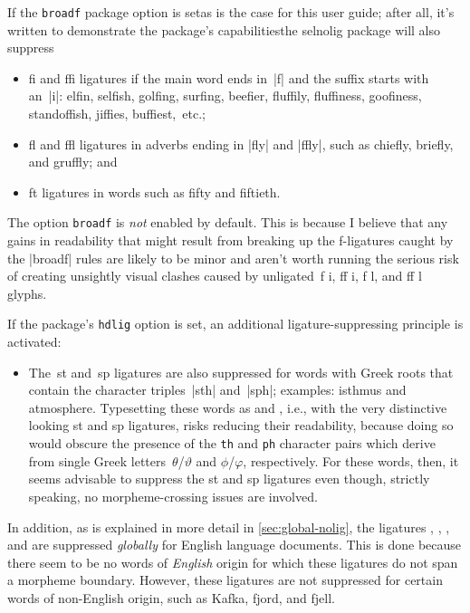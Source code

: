 \documentclass[11pt]{article}
\newcommand{\pkg}[1]{\textsf{#1}}
\newcommand{\opt}[1]{\texttt{#1}}
\begin{document}
If the \opt{broadf} package option is set\textemdash as is the case for this user guide; after all, it's written to demonstrate the package's capabilities\textemdash the \pkg{selnolig} package will also suppress
\begin{itemize}
\item fi and ffi ligatures if the main word ends in~|f| and the suffix starts with an~|i|: elfin, selfish, golfing, surfing, beefier, fluffily, fluffiness, goofiness, standoffish, jiffies, buffiest,~etc.;
\item fl and ffl ligatures in adverbs ending in |fly| and |ffly|, such as chiefly, briefly, and gruffly; and
\item ft ligatures in words such as fifty and fiftieth.
\end{itemize}

The option \opt{broadf} is \emph{not} enabled by default. This is because I believe that any gains in readability that might result from breaking up the f-ligatures caught by the |broadf| rules are likely to be minor and aren't worth running the serious risk of creating unsightly visual clashes caused by unligated~f\kern0pt i, ff\kern0pt i, f\kern0pt l, and ff\kern0pt l glyphs.

If the package's \opt{hdlig} option is set, an additional ligature-suppressing principle is activated:
\begin{itemize}
\item The~st and~sp ligatures are also suppressed for words with Greek roots that contain the character triples~|sth| and~|sph|; examples: isthmus and atmosphere. Typesetting these words as  and , i.e., with the very distinctive looking st and sp ligatures, risks reducing their readability, because doing so would obscure the presence of the \opt{th} and \opt{ph} character pairs which derive from single Greek letters~$\theta$/$\vartheta$ and $\phi$/$\varphi$, respectively. For these words, then, it seems advisable to suppress the st and sp ligatures even though, strictly speaking, no morpheme-crossing issues are involved. 

\end{itemize}

In addition, as is explained in more detail in \cref{sec:global-nolig}, the ligatures {\ebg {}, , }, and {\ebg {}} are suppressed \emph{globally} for English language documents. This is done because there seem to be no words of \emph{English} origin for which these ligatures do not span a morpheme boundary. However, these ligatures are not suppressed for certain words of non-English origin, such as {\ebg Kafka, fjord, and fjell}. 
\end{document}
